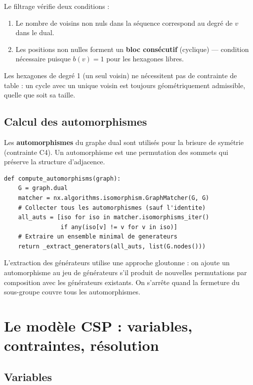 \documentclass[12pt,a4paper]{article}
\theoremstyle{definition}
\begin{document}
Le filtrage vérifie deux conditions :
\begin{enumerate}
  \item Le nombre de voisins non nuls dans la séquence correspond au degré de $v$ dans le dual.
  \item Les positions non nulles forment un \textbf{bloc consécutif} (cyclique) — condition
    nécessaire puisque $b(v) = 1$ pour les hexagones libres.
\end{enumerate}

\begin{remarque}
  Les hexagones de degré 1 (un seul voisin) ne nécessitent pas de contrainte de table :
  un cycle avec un unique voisin est toujours géométriquement admissible, quelle que soit
  sa taille.
\end{remarque}

\subsection{Calcul des automorphismes}

Les \textbf{automorphismes} du graphe dual sont utilisés pour la brisure de symétrie
(contrainte C4). Un automorphisme est une permutation des sommets qui préserve la structure
d'adjacence.

\begin{lstlisting}
def compute_automorphisms(graph):
    G = graph.dual
    matcher = nx.algorithms.isomorphism.GraphMatcher(G, G)
    # Collecter tous les automorphismes (sauf l'identite)
    all_auts = [iso for iso in matcher.isomorphisms_iter()
                if any(iso[v] != v for v in iso)]
    # Extraire un ensemble minimal de generateurs
    return _extract_generators(all_auts, list(G.nodes()))
\end{lstlisting}

L'extraction des générateurs utilise une approche gloutonne : on ajoute un automorphisme au
jeu de générateurs s'il produit de nouvelles permutations par composition avec les générateurs
existants. On s'arrête quand la fermeture du sous-groupe couvre tous les automorphismes.

\section{Le modèle CSP : variables, contraintes, résolution}

\subsection{Variables}
\end{document}
